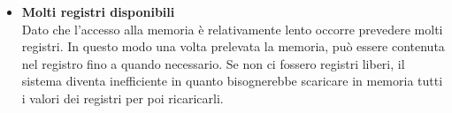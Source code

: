 \documentclass[12pt]{report}
\begin{document}
\begin{itemize}
	Uno dei modi più semplici per dividere le operazioni passi separati è che quello di richiedere che gli operandi vengano prelevati dai registri e siano memorizzati al loro interno. L'operazione di spostamento degli operandi alla memoria viene compiuta da apposite istruzioni. Visto che l'accesso in memoria richiede tempo, queste operazioni possono essere sovrapposte dall'esecuzione di altre istruzioni. Questo porta alla conclusione che solo le istruzioni LOAD e STORE dovrebbero far riferimento alla memoria.
	\item \textbf{Molti registri disponibili} \\
	Dato che l'accesso alla memoria è relativamente lento occorre prevedere molti registri. In questo modo una volta prelevata la memoria, può essere contenuta nel registro fino a quando necessario. Se non ci fossero registri liberi, il sistema diventa inefficiente in quanto bisognerebbe scaricare in memoria tutti i valori dei registri per poi ricaricarli.
\end{itemize}
\end{document}
